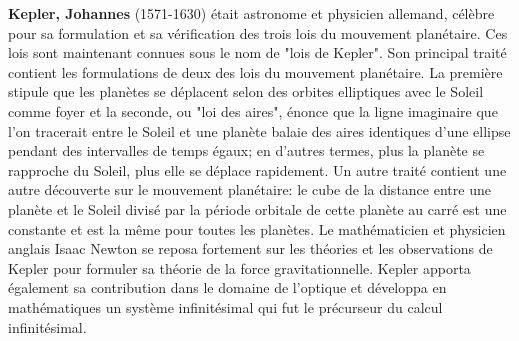 {}
\label{sec:K}

\textbf{Kepler, Johannes} (1571-1630) était astronome et physicien allemand, célèbre pour sa formulation et sa vérification des trois lois du mouvement planétaire. Ces lois sont maintenant connues sous le nom de "lois de Kepler". Son principal traité contient les formulations de deux des lois du mouvement planétaire. La première stipule que les planètes se déplacent selon des orbites elliptiques avec le Soleil comme foyer et la seconde, ou "loi des aires", énonce que la ligne imaginaire que l'on tracerait entre le Soleil et une planète balaie des aires identiques d'une ellipse pendant des intervalles de temps égaux; en d'autres termes, plus la planète se rapproche du Soleil, plus elle se déplace rapidement. Un autre traité contient une autre découverte sur le mouvement planétaire: le cube de la distance entre une planète et le Soleil divisé par la période orbitale de cette planète au carré est une constante et est la même pour toutes les planètes. Le mathématicien et physicien anglais Isaac Newton se reposa fortement sur les théories et les observations de Kepler pour formuler sa théorie de la force gravitationnelle. Kepler apporta également sa contribution dans le domaine de l'optique et développa en mathématiques un système infinitésimal qui fut le précurseur du calcul infinitésimal.

